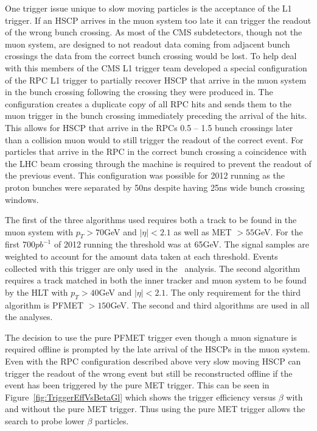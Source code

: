 One trigger issue unique to slow moving particles is the acceptance of the L1 trigger. If an HSCP arrives in the muon system too late it can trigger the
readout of the wrong bunch crossing. As most of the CMS subdetectors, though not the muon system, are designed to not readout data coming from adjacent bunch crossings
the data from the correct bunch crossing would be lost. To help deal with this members of the CMS L1 trigger team developed a special configuration of the
RPC L1 trigger to partially recover HSCP that arrive in the muon system in the bunch crossing following the crossing they were produced in.
The configuration creates a duplicate copy of all RPC hits and sends them to the muon trigger in the bunch crossing immediately preceding the arrival of the hits. 
This allows for HSCP that
arrive in the RPCs 0.5 -- 1.5 bunch crossings later than a collision muon would to still trigger the readout of the correct event. For particles that arrive in the RPC
in the correct bunch crossing a coincidence with the LHC beam crossing through the machine is required to prevent the readout of the previous event. This configuration
was possible for 2012 running as the proton bunches were separated by 50ns despite having 25ns wide bunch crossing windows.

The first of the three algorithms used requires both a track to be found in the muon system with $p_T > 70$GeV and $|\eta| < 2.1$ as well as MET $ > 55$GeV. 
For the first 700$pb^{-1}$ of 2012 running the threshold was at 65GeV. The signal samples are weighted
to account for the amount data taken at each threshold. Events collected with this trigger are only used
in the \muononly\ analysis.
The second algorithm requires a track matched in both the inner tracker
and muon system to be found by the HLT with $p_T > 40$GeV and $|\eta| < 2.1$. The only requirement for the third algorithm is PFMET $ > 150$GeV.
The second and third algorithms are used in all the analyses.

The decision to use the pure PFMET trigger even though a muon signature is required offline is prompted by the late arrival of the HSCPs in the muon system.
Even with the RPC configuration described above very slow moving HSCP can trigger the readout of the wrong event but still be reconstructed offline
if the event has been triggered by the pure MET trigger. This can be seen in Figure~\ref{fig:TriggerEffVsBetaGl} which shows the trigger efficiency versus $\beta$
with and without the pure MET trigger. Thus using the pure MET trigger allows the search to probe lower $\beta$ particles. 

